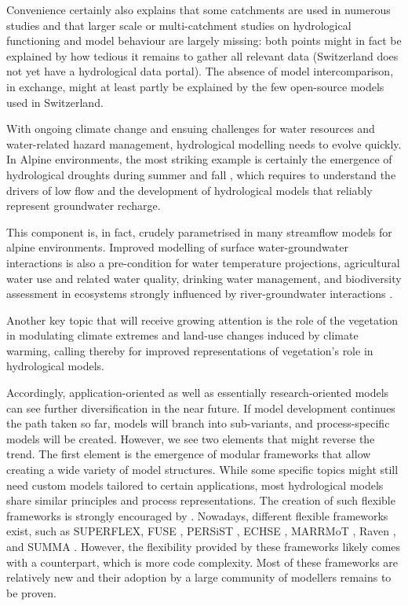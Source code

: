 \documentclass[10pt,a4paper]{article}
\begin{document}
Convenience certainly also explains that some catchments are used in numerous studies and that larger scale or multi-catchment studies on hydrological functioning and model behaviour are largely missing: both points might in fact be explained by how tedious it remains to gather all relevant data (Switzerland does not yet have a hydrological data portal). The absence of model intercomparison, in exchange, might at least partly be explained by the few open-source models used in
Switzerland. 

With ongoing climate change and ensuing challenges for water resources and water-related hazard management, hydrological modelling needs to evolve quickly. In Alpine environments, the most striking example is certainly the emergence of hydrological droughts \citep{Van_Loon_2015} during summer and fall \citep{brunner2019drought,Rigling2020}, which requires to understand the drivers of low flow \citep{Arnoux_2020} and the development of hydrological models that reliably represent groundwater recharge.

This component is, in fact, crudely parametrised in many streamflow models for alpine environments. Improved modelling of surface water-groundwater interactions is also a pre-condition for water temperature projections, agricultural water use and related water quality, drinking water management, and biodiversity assessment in ecosystems strongly influenced by river-groundwater interactions \citep{Brunner_2017}. 

Another key topic that will receive growing attention is the role of the vegetation in modulating climate extremes \citep{Mastrotheodoros_2020} and land-use changes induced by climate warming, calling thereby for improved representations of vegetation's role in hydrological models.

Accordingly, application-oriented as well as essentially research-oriented models can see further diversification in the near future. If model development continues the path taken so far, models will branch into sub-variants, and process-specific models will be created. However, we see two elements that might reverse the trend. The first element is the emergence of modular frameworks that allow creating a wide variety of model structures. While some specific topics might still need custom models tailored to certain applications, most hydrological models share similar principles and process representations. The creation of such flexible frameworks is strongly encouraged by \citet{Clark2011a}. Nowadays, different flexible frameworks exist, such as SUPERFLEX, FUSE \citep{Clark2008}, PERSiST \citep{Futter2014}, ECHSE \citep{Kneis2015}, MARRMoT \citep{Knoben2019}, Raven \citep{Craig2020}, and SUMMA \citep{Clark2015}. {However, the flexibility provided by these frameworks likely comes with a counterpart, which is more code complexity. Most of these frameworks are relatively new and their adoption by a large community of modellers remains to be proven}.
\end{document}

